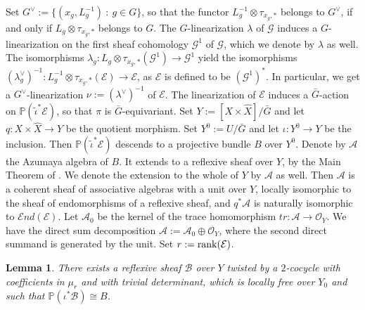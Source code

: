 \documentclass[12pt]{amsart}
\numberwithin{equation}{subsection}
\theoremstyle{plain}
\newtheorem{lem}[thm]{Lemma}
\theoremstyle{definition}
\newcommand{\A}{{\mathcal A}}
\newcommand{\B}{{\mathcal B}}
\newcommand{\E}{{\mathcal E}}
\newcommand{\G}{{\mathcal G}}
\newcommand{\PP}{{\mathbb P}}
\newcommand{\StructureSheaf}[1]{{\mathcal O}_{#1}}
\newcommand{\rank}{{\rm rank}}
\newcommand{\SheafEnd}{{\mathcal E}nd}
\begin{document}
Set $G^\vee:=\{(x_g,L_g^{-1}) \ : \ g\in G\}$, so that the functor $L_g^{-1}\otimes\tau_{x_g,*}$ belongs to $G^\vee$, if and only if $L_g\otimes\tau_{x_g,*}$ belongs to $G$. 
The $G$-linearization $\lambda$ of $\G$ induces a $G$-linearization on the first sheaf cohomology $\G^1$ of $\G$, which we denote by $\lambda$ as well.
The isomorphisms $\lambda_g:L_g\otimes\tau_{x_g,*}(\G^1)\rightarrow \G^1$ yield the isomorphisms
$(\lambda_g^\vee)^{-1}:L_g^{-1}\otimes\tau_{x_g,*}(\E)\rightarrow \E$, as $\E$ is defined to be $(\G^1)^*$. In particular, we get a $G^\vee$-linearization $\nu:=(\lambda^\vee)^{-1}$ of $\E$.
The linearization of
$\E$ induces a $\bar{G}$-action on $\PP(\tilde{\iota}^*\E)$, so that $\pi$ is $\bar{G}$-equivariant. 
Set $Y:=[X\times\hat{X}]/\bar{G}$ and let $q:X\times \hat{X}\rightarrow Y$ be the quotient morphism. 
Set $Y^0:=U/\bar{G}$ and let $\iota:Y^0\rightarrow Y$ be the inclusion.
Then $\PP(\tilde{\iota}^*\E)$ descends to a projective bundle $B$ over $Y^0$. Denote by $\A$ the Azumaya algebra of $B$. 
It extends to a reflexive sheaf over $Y$, by the Main Theorem of \cite{siu}. We denote the extension to the whole of $Y$ by $\A$ as well.
Then $\A$ is a coherent sheaf of associative algebras with a unit over $Y$, locally isomorphic to the sheaf of endomorphisms of a reflexive sheaf,  and $q^*\A$ is naturally isomorphic to $\SheafEnd(\E)$. Let $\A_0$ be the kernel of the trace homomorphism $tr:\A\rightarrow \StructureSheaf{Y}$.
We have the direct sum decomposition $\A:=\A_0\oplus \StructureSheaf{Y}$, where the second direct summand is generated by the unit. Set $r:=\rank(\E)$. 

\begin{lem}
\label{lemma-E-descends-to-a-reflexive-twisted-sheaf-B-over-Y}
There exists a reflexive sheaf $\B$ over $Y$ twisted by a $2$-cocycle with coefficients in $\mu_r$ and with trivial determinant, which is locally free over $Y_0$ and such that 
$\PP(\iota^*\B)\cong B$.
\end{lem}
\end{document}
